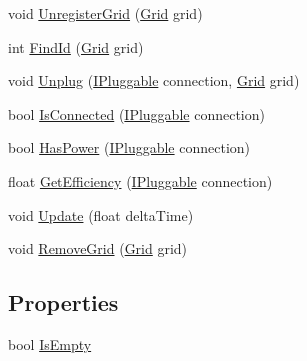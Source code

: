\begin{DoxyCompactItemize}
\item 
void \hyperlink{class_project_porcupine_1_1_power_network_1_1_power_network_adb1df109d9b1d726f1dc2f04b7a22790}{Unregister\+Grid} (\hyperlink{class_project_porcupine_1_1_power_network_1_1_grid}{Grid} grid)
\item 
int \hyperlink{class_project_porcupine_1_1_power_network_1_1_power_network_aeaa524d5399b8e7c6501302f154426f2}{Find\+Id} (\hyperlink{class_project_porcupine_1_1_power_network_1_1_grid}{Grid} grid)
\item 
void \hyperlink{class_project_porcupine_1_1_power_network_1_1_power_network_ac655c711ae186faae70f895093f5c87b}{Unplug} (\hyperlink{interface_project_porcupine_1_1_power_network_1_1_i_pluggable}{I\+Pluggable} connection, \hyperlink{class_project_porcupine_1_1_power_network_1_1_grid}{Grid} grid)
\item 
bool \hyperlink{class_project_porcupine_1_1_power_network_1_1_power_network_ae3345d8a1bbc51e45d2e15c95b4d33ea}{Is\+Connected} (\hyperlink{interface_project_porcupine_1_1_power_network_1_1_i_pluggable}{I\+Pluggable} connection)
\item 
bool \hyperlink{class_project_porcupine_1_1_power_network_1_1_power_network_a75d0d87082ec50107efd0155281fed26}{Has\+Power} (\hyperlink{interface_project_porcupine_1_1_power_network_1_1_i_pluggable}{I\+Pluggable} connection)
\item 
float \hyperlink{class_project_porcupine_1_1_power_network_1_1_power_network_a7c9f4edf45e6b56e3db795ab58cc3b8d}{Get\+Efficiency} (\hyperlink{interface_project_porcupine_1_1_power_network_1_1_i_pluggable}{I\+Pluggable} connection)
\item 
void \hyperlink{class_project_porcupine_1_1_power_network_1_1_power_network_a88546562be3847a216a646eae4c49d40}{Update} (float delta\+Time)
\item 
void \hyperlink{class_project_porcupine_1_1_power_network_1_1_power_network_a0393655d75db5e07a1cbc0f302c01b4e}{Remove\+Grid} (\hyperlink{class_project_porcupine_1_1_power_network_1_1_grid}{Grid} grid)
\end{DoxyCompactItemize}
\subsection*{Properties}
\begin{DoxyCompactItemize}
\item 
bool \hyperlink{class_project_porcupine_1_1_power_network_1_1_power_network_a9f24883e16e785a1737592f523d1c18d}{Is\+Empty}
\end{DoxyCompactItemize}


